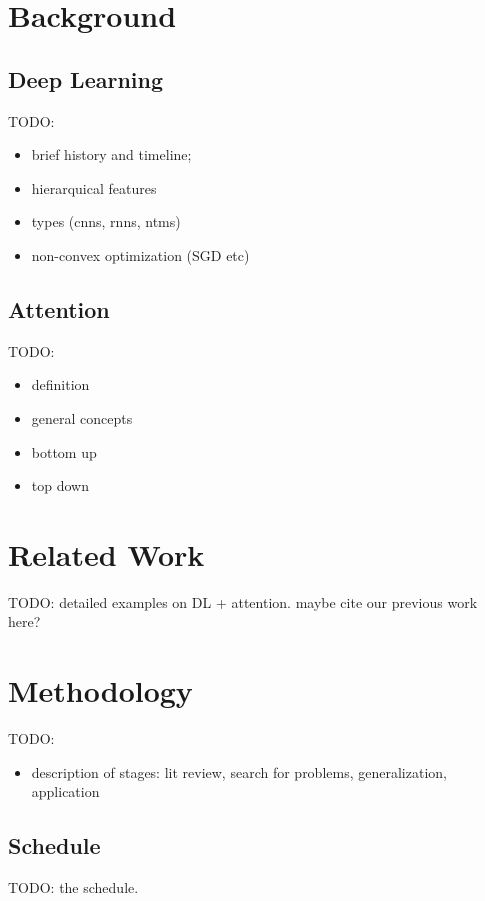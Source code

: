 \documentclass[article]{IEEEtran}
\begin{document}
\section{Background}
\subsection{Deep Learning}
TODO:
\begin{itemize}
    \item brief history and timeline;
    \item hierarquical features
    \item types (cnns, rnns, ntms)
    \item non-convex optimization (SGD etc)
\end{itemize}
\subsection{Attention}
TODO:
\begin{itemize}
    \item definition
    \item general concepts
    \item bottom up
    \item top down
\end{itemize}

\section{Related Work}
TODO: detailed examples on DL + attention.
maybe cite our previous work here?

\section{Methodology}
TODO:
\begin{itemize}
    \item description of stages: lit review,
        search for problems, generalization, application
\end{itemize}

\subsection{Schedule}
TODO: the schedule.

\printbibliography
\end{document}
